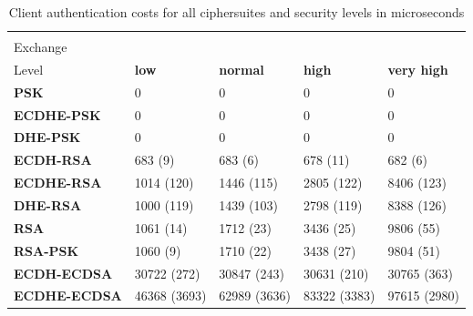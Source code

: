 		\begin{table}[]
		  \begin{tabular}{|l|l|l|l|l|}
		  \hline
		   \backslashbox{Key\\Exchange}{Security\\Level}                    & \textbf{low} & \textbf{normal} & \textbf{high} & \textbf{very high} \\ \hline
		  \textbf{PSK}         & 0            & 0               & 0             & 0                  \\ \hline
		  \textbf{ECDHE-PSK}   & 0            & 0               & 0             & 0                  \\ \hline
		  \textbf{DHE-PSK}     & 0            & 0               & 0             & 0                  \\ \hline
		  \textbf{ECDH-RSA}    & 683 (9)       & 683 (6)          & 678 (11)       & 682 (6)             \\ \hline
		  \textbf{ECDHE-RSA}   & 1014 (120)    & 1446 (115)       & 2805 (122)     & 8406 (123)          \\ \hline
		  \textbf{DHE-RSA}     & 1000 (119)    & 1439 (103)       & 2798 (119)     & 8388 (126)          \\ \hline
		  \textbf{RSA}         & 1061 (14)     & 1712 (23)        & 3436 (25)      & 9806 (55)           \\ \hline
		  \textbf{RSA-PSK}     & 1060 (9)      & 1710 (22)        & 3438 (27)      & 9804 (51)           \\ \hline
		  \textbf{ECDH-ECDSA}  & 30722 (272)   & 30847 (243)      & 30631 (210)    & 30765 (363)         \\ \hline
		  \textbf{ECDHE-ECDSA} & 46368 (3693)  & 62989 (3636)     & 83322 (3383)   & 97615 (2980)        \\ \hline
		  \end{tabular}
		  \caption{Client authentication costs for all ciphersuites and security levels in microseconds}
		  \label{table:papi-cli-auth-cost}
		  \end{table}
  
